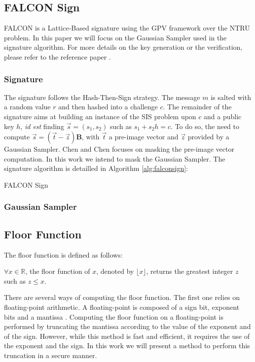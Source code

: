 \documentclass[runningheads]{llncs}
\begin{document}
\subsection{FALCON Sign}
FALCON \cite{prest2020falcon} is a Lattice-Based signature using the GPV framework over the NTRU problem. In this paper we will focus on the Gaussian Sampler used in the signature algorithm. For more details on the key generation or the verification, please refer to the reference paper \cite{prest2020falcon}.

\subsubsection{Signature} The signature follows the Hash-Then-Sign strategy. The message $m$ is salted with a random value $r$ and then hashed into a challenge $c$. The remainder of the signature aims at building an instance of the SIS problem upon $c$ and a public key $h$, \emph{id est} finding $\vec{s} =(s_1,s_2)$ such as $s_1 + s_2 h = c$. To do so, the need to compute $\vec{s} = (\vec{t}-\vec{z})\mathbf{B}$, with $\vec{t}$ a pre-image vector and $\vec{z}$ provided by a Gaussian Sampler. Chen and Chen \cite{Chen_Chen_2024} focuses on masking the pre-image vector computation. In this work we intend to mask the Gaussian Sampler. The signature algorithm is detailled in Algorithm \ref{alg:falconsign}:

\begin{algorithm}[H]
  \caption{FALCON Sign \cite{prest2020falcon}}
  \label{alg:falconsign}
\end{algorithm}

\subsubsection{Gaussian Sampler}


\subsection{Floor Function}\label{subsec:floorfunction}
The floor function is defined as follows:
\begin{definition}\label{def:floorfunction}
  $\forall x \in \mathbb{R}$, the floor function of $x$, denoted by $\lfloor x \rfloor$, returns the greatest integer $z$ such as $z\leq x$.
\end{definition}
There are several ways of computing the floor function. The first one relies on floating-point arithmetic. A floating-point is composed of a sign bit, exponent bits and a mantissa \cite{kahan1996ieee}. Computing the floor function on a floating-point is performed by truncating the mantissa according to the value of the exponent and of the sign. However, while this method is fast and efficient, it requires the use of the exponent and the sign. In this work we will present a method to perform this truncation in a secure manner.
\end{document}
